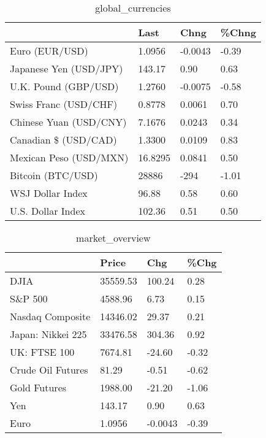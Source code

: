 \documentclass{article}%
\begin{document}
%


\begin{table}[htbp]%
\caption{global\_currencies}%
\centering%
\begin{adjustbox}{width=1\textwidth}%
\begin{tabular}{llll}
\toprule
                       &    Last &    Chng & \%Chng \\
\midrule
        Euro (EUR/USD) &  1.0956 & -0.0043 & -0.39 \\
Japanese Yen (USD/JPY) &  143.17 &    0.90 &  0.63 \\
  U.K. Pound (GBP/USD) &  1.2760 & -0.0075 & -0.58 \\
 Swiss Franc (USD/CHF) &  0.8778 &  0.0061 &  0.70 \\
Chinese Yuan (USD/CNY) &  7.1676 &  0.0243 &  0.34 \\
  Canadian \$ (USD/CAD) &  1.3300 &  0.0109 &  0.83 \\
Mexican Peso (USD/MXN) & 16.8295 &  0.0841 &  0.50 \\
     Bitcoin (BTC/USD) &   28886 &    -294 & -1.01 \\
      WSJ Dollar Index &   96.88 &    0.58 &  0.60 \\
     U.S. Dollar Index &  102.36 &    0.51 &  0.50 \\
\bottomrule
\end{tabular}
%
\end{adjustbox}%
\end{table}

%


\begin{table}[htbp]%
\caption{market\_overview}%
\centering%
\begin{adjustbox}{width=1\textwidth}%
\begin{tabular}{llll}
\toprule
                  &    Price &     Chg &  \%Chg \\
\midrule
             DJIA & 35559.53 &  100.24 &  0.28 \\
          S\&P 500 &  4588.96 &    6.73 &  0.15 \\
 Nasdaq Composite & 14346.02 &   29.37 &  0.21 \\
Japan: Nikkei 225 & 33476.58 &  304.36 &  0.92 \\
     UK: FTSE 100 &  7674.81 &  -24.60 & -0.32 \\
Crude Oil Futures &    81.29 &   -0.51 & -0.62 \\
     Gold Futures &  1988.00 &  -21.20 & -1.06 \\
              Yen &   143.17 &    0.90 &  0.63 \\
             Euro &   1.0956 & -0.0043 & -0.39 \\
\bottomrule
\end{tabular}
%
\end{adjustbox}%
\end{table}

%
\end{document}
